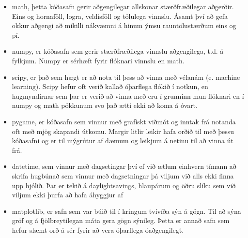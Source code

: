 \begin{itemize}
	\item math, þetta kóðasafn gerir aðgengilegar allskonar stærðfræðilegar aðgerðir.
	Eins og hornaföll, logra, veldisföll og tölulega vinnslu.
	Ásamt því að gefa okkur aðgengi að mikilli nákvæmni á hinum ýmsu rauntölustærðum eins og pí.
	\item numpy, er kóðasafn sem gerir stærðfræðilega vinnslu aðgengilega, t.d. á fylkjum.
	Numpy er sérhæft fyrir flóknari vinnslu en math.
	\item scipy, er það sem hægt er að nota til þess að vinna með vélanám (e. machine learning).
	Scipy hefur oft verið kallað óþarflega flókið í notkun, en hugmyndirnar sem þar er verið að vinna með eru í grunninn mun flóknari en í numpy og math pökkunum svo það ætti ekki að koma á óvart.
	\item pygame, er kóðasafn sem vinnur með grafískt viðmót og inntak frá notanda oft með mjög skapandi útkomu.
	Margir litlir leikir hafa orðið til með þessu kóðasafni og er til mýgrútur af dæmum og leikjum á netinu til að vinna út frá.
	\item datetime, sem vinnur með dagsetingar því ef við ætlum einhvern tímann að skrifa hugbúnað sem vinnur með dagsetningar þá viljum við alls ekki finna upp hjólið.
	Þar er tekið á daylightsavings, hlaupárum og öðru slíku sem við viljum ekki þurfa að hafa áhyggjur af
	\item matplotlib, er safn sem var búið til í kringum tvívíða sýn á gögn.
	Til að sýna gröf og á fjölbreytilegan máta gera gögn sýnileg.
	Þetta er annað safn sem hefur slæmt orð á sér fyrir að vera óþarflega óaðgengilegt.
\end{itemize}